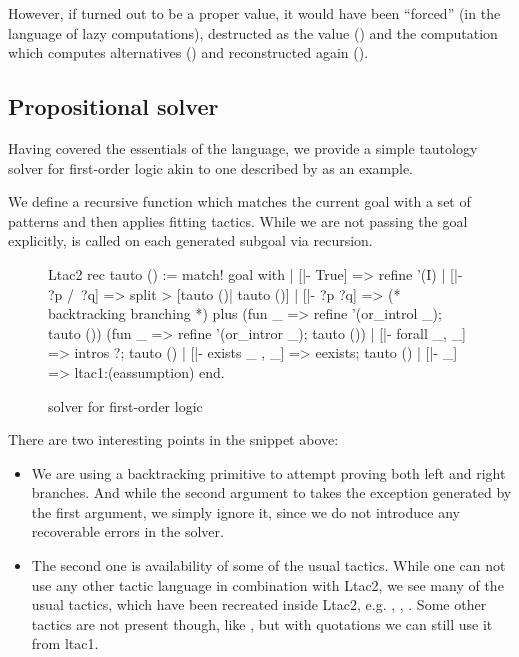 However, if  turned out to be a proper value, it would have been ``forced'' (in the language of lazy computations), destructed as the value () and the computation which computes alternatives () and reconstructed again ().

\subsection{Propositional solver}
\label{sec:propositional-solver}

Having covered the essentials of the language, we provide a simple tautology solver for first-order logic akin to one described by \citet{zilianiMtacMonadTyped2013} as an example.

We define a recursive function  which matches the current goal with a set of patterns and then applies fitting tactics.
While we are not passing the goal explicitly,  is called on each generated subgoal via recursion.

\begin{figure}[H]
\begin{coq}
Ltac2 rec tauto () :=
  match! goal with
  | [|- True] =>
    refine '(I)
  | [|- ?p /\ ?q] =>
    split > [tauto ()| tauto ()]
  | [|- ?p \/ ?q] =>
    (* backtracking branching *)
    plus (fun _ => refine '(or_introl _); tauto ())
         (fun _ => refine '(or_intror _); tauto ())
  | [|- forall _, _] =>
    intros ?; tauto ()
  | [|- exists _ , _] =>
    eexists; tauto ()
  | [|- _] => ltac1:(eassumption)
  end.
\end{coq}
\caption{solver for first-order logic}
\label{fig:ltac2-solver}
\end{figure}

There are two interesting points in the snippet above:
\begin{itemize}
\item We are using a backtracking primitive  to attempt proving both left and right branches.
  And while the second argument to  takes the exception generated by the first argument, we simply ignore it, since we do not introduce any recoverable errors in the solver.
\item The second one is availability of some of the usual tactics.
  While one can not use any other tactic language in combination with Ltac2, we see many of the usual tactics, which have been recreated inside Ltac2, e.g.  , , .
  Some other tactics are not present though, like , but with quotations we can still use it from ltac1.
\end{itemize}

